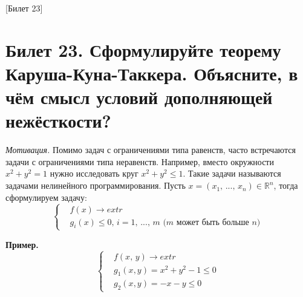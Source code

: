[Билет 23]

\section{Билет 23. Сформулируйте теорему Каруша-Куна-Таккера. Объясните, в чём смысл условий дополняющей нежёсткости?}
\textit{Мотивация.} Помимо задач с ограничениями типа равенств, часто встречаются задачи с ограничениями типа неравенств.
Например, вместо окружности $x^2 + y^2 = 1$ нужно исследовать круг $x^2 + y^2 \leqslant 1$. Такие задачи называются задачами
нелинейного программирования. Пусть $x = (x_1, \, ..., \, x_n) \in \mathbb{R}^n$, тогда сформулируем задачу:
\[\left\{\begin{aligned}
    &f(x) \to extr \\
    &g_i(x) \leqslant 0, \, i = 1, \,..., \, m \text{ ($m$ может быть больше $n$)}
\end{aligned}\right.\]

\textbf{Пример.}
\[\left\{\begin{aligned}
    &f(x, \, y) \to extr \\
    &g_1(x, y) = x^2 + y^2 - 1 \leqslant 0 \\
    &g_2(x, y) = -x - y \leqslant 0
\end{aligned}\right.\]

\begin{figure}[h]
    \begin{center}
    \end{center}
\end{figure}

